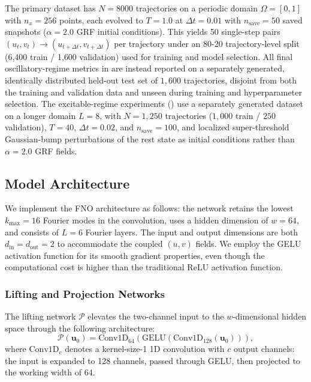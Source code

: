 \documentclass[runningheads]{llncs}
\begin{document}
The primary dataset has $N = 8000$ trajectories on a periodic domain $\Omega = [0, 1]$ with $n_x = 256$ points, each evolved to $T = 1.0$ at $\Delta t = 0.01$ with $n_{\text{save}} = 50$ saved snapshots ($\alpha = 2.0$ GRF initial conditions). This yields 50 single-step pairs $(u_t, v_t) \rightarrow (u_{t+\Delta t}, v_{t+\Delta t})$ per trajectory under an 80-20 trajectory-level split (6{,}400 train / 1{,}600 validation) used for training and model selection. All final oscillatory-regime metrics in  are instead reported on a separately generated, identically distributed held-out test set of $1{,}600$ trajectories, disjoint from both the training and validation data and unseen during training and hyperparameter selection. The excitable-regime experiments () use a separately generated dataset on a longer domain $L = 8$, with $N = 1{,}250$ trajectories ($1{,}000$ train / $250$ validation), $T = 40$, $\Delta t = 0.02$, and $n_{\text{save}} = 100$, and localized super-threshold Gaussian-bump perturbations of the rest state as initial conditions rather than $\alpha = 2.0$ GRF fields.


\subsection{Model Architecture}
\label{sec:model_architecture}

We implement the FNO architecture as follows: the network retains the lowest $k_{\max} = 16$ Fourier modes in the convolution, uses a hidden dimension of $w = 64$, and consists of $L = 6$ Fourier layers. The input and output dimensions are both $d_{\text{in}} = d_{\text{out}} = 2$ to accommodate the coupled $(u, v)$ fields. We employ the GELU activation function for its smooth gradient properties, even though the computational cost is higher than the traditional ReLU activation function.


\subsubsection{Lifting and Projection Networks}
\label{sec:lifting_projection}

The lifting network $\mathcal{P}$ elevates the two-channel input to the $w$-dimensional hidden space through the following architecture:
\begin{equation}
    \mathcal{P}(\bm{u}_0) = \text{Conv1D}_{64}\left(\text{GELU}\left(\text{Conv1D}_{128}(\bm{u}_0)\right)\right),
\end{equation}
where $\text{Conv1D}_c$ denotes a kernel-size-1 1D convolution with $c$ output channels: the input is expanded to 128 channels, passed through GELU, then projected to the working width of 64.
\end{document}
